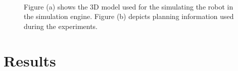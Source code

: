 \begin{figure}[thpb]
     \footnotesize
      \centering
      \myfloatalign
      \setlength\fboxsep{0pt}
      \setlength\fboxrule{0.5pt}
       \\
       \caption[Simulation environment]{Figure (a) shows the 3D model used for the simulating the robot in the simulation engine. Figure (b) depicts planning information used during the experiments.}
      \label{fig:gazebo_v4r}
   \end{figure}

\section{Results}\label{sec:testresults}

